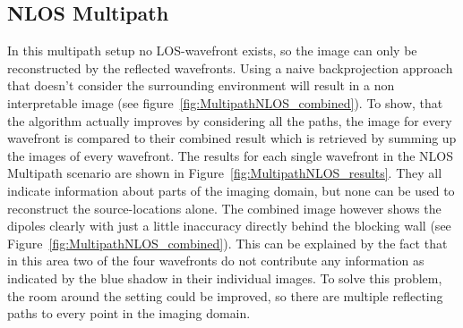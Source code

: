 \subsection{NLOS Multipath}
In this multipath setup no LOS-wavefront exists, so the image can only be reconstructed by the reflected wavefronts.
Using a naive backprojection approach that doesn't consider the surrounding environment will result in a non interpretable image (see figure~\ref{fig:MultipathNLOS_combined}). 
To show, that the algorithm actually improves by considering all the paths, the image for every wavefront is compared to their combined result which is retrieved by summing up the images of every wavefront.
The results for each single wavefront in the NLOS Multipath scenario are shown in Figure~\ref{fig:MultipathNLOS_results}.
They all indicate information about parts of the imaging domain, but none can be used to reconstruct the source-locations alone.
The combined image however shows the dipoles clearly with just a little inaccuracy directly behind the blocking wall (see Figure~\ref{fig:MultipathNLOS_combined}).
This can be explained by the fact that in this area two of the four wavefronts do not contribute any information as indicated by the blue shadow in their individual images.
To solve this problem, the room around the setting could be improved, so there are multiple reflecting paths to every point in the imaging domain.

